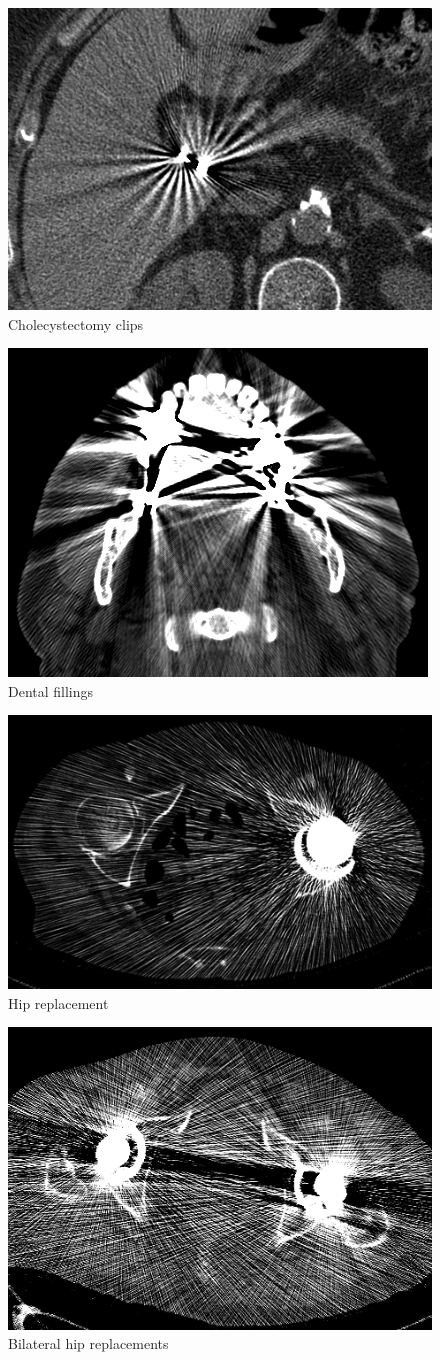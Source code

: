 \begin{figure}[h!]
	\centering
	\includegraphics[width=0.5\linewidth]{images/11_FBP.png}
	\caption{Cholecystectomy clips\cite{revisionrads}}
\end{figure}
\begin{figure}[h!]
	\centering
	\includegraphics[width=0.5\linewidth]{images/06_FBP.png}
	\caption{Dental fillings\cite{revisionrads}}
\end{figure}
\begin{figure}[h!]
	\centering
	\includegraphics[width=0.5\linewidth]{images/05_FBP.png}
	\caption{Hip replacement\cite{revisionrads}}
\end{figure}
\begin{figure}[h!]
	\centering
	\includegraphics[width=0.5\linewidth]{images/09_FBP.png}
	\caption{Bilateral hip replacements\cite{revisionrads}}
\end{figure}

